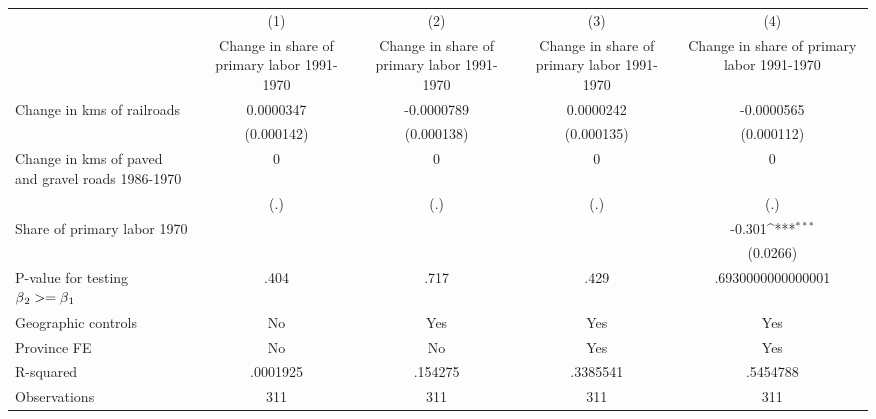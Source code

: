 {
\def\sym#1{\ifmmode^{#1}\else\(^{#1}\)\fi}
\begin{tabular}{l*{4}{c}}
\hline\hline
                &\multicolumn{1}{c}{(1)}&\multicolumn{1}{c}{(2)}&\multicolumn{1}{c}{(3)}&\multicolumn{1}{c}{(4)}\\
                &\multicolumn{1}{c}{Change in share of primary labor 1991-1970}&\multicolumn{1}{c}{Change in share of primary labor 1991-1970}&\multicolumn{1}{c}{Change in share of primary labor 1991-1970}&\multicolumn{1}{c}{Change in share of primary labor 1991-1970}\\
\hline
Change in kms of railroads&0.0000347         &-0.0000789         &0.0000242         &-0.0000565         \\
                &(0.000142)         &(0.000138)         &(0.000135)         &(0.000112)         \\
[1em]
Change in kms of paved and gravel roads 1986-1970&        0         &        0         &        0         &        0         \\
                &      (.)         &      (.)         &      (.)         &      (.)         \\
[1em]
Share of primary labor 1970&                  &                  &                  &   -0.301\sym{***}\\
                &                  &                  &                  & (0.0266)         \\
\hline
P-value for testing $\beta\\_2 >= \beta\\_1$&     .404         &     .717         &     .429         &.6930000000000001         \\
Geographic controls&       No         &      Yes         &      Yes         &      Yes         \\
Province FE     &       No         &       No         &      Yes         &      Yes         \\
R-squared       & .0001925         &  .154275         & .3385541         & .5454788         \\
Observations    &      311         &      311         &      311         &      311         \\
\hline\hline
\end{tabular}
}
